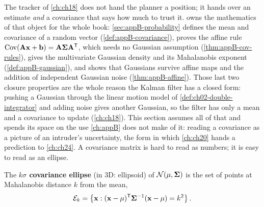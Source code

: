 The tracker of \cref{ch:ch18} does not hand the planner a position; it hands over an estimate \emph{and} a covariance that says how much to trust it.  owns the mathematics of that object for the whole book: \cref{sec:appB-probability} defines the mean and covariance of a random vector (\cref{def:appB-covariance}), proves the affine rule $\operatorname{Cov}(\mathbf{A}\mathbf{x}+\mathbf{b})=\mathbf{A}\mathbf{\Sigma}\mathbf{A}^{\mathsf{T}}$, which needs no Gaussian assumption (\cref{thm:appB-cov-rules}), gives the multivariate Gaussian density and its Mahalanobis exponent (\cref{def:appB-gaussian}), and shows that Gaussians survive affine maps and the addition of independent Gaussian noise (\cref{thm:appB-affine}). Those last two closure properties are the whole reason the Kalman filter has a closed form: pushing a Gaussian through the linear motion model of \cref{def:ch02-double-integrator} and adding noise gives another Gaussian, so the filter has only a mean and a covariance to update (\cref{ch:ch18}). This section assumes all of that and spends its space on the use \cref{ch:appB} does not make of it: reading a covariance as a picture of an intruder's uncertainty, the form in which \cref{ch:ch20} hands a prediction to \cref{ch:ch24}. A covariance matrix is hard to read as numbers; it is easy to read as an ellipse.

\begin{definition}
\label{def:ch02-covariance-ellipse}
The \textbf{$k\sigma$ covariance ellipse} (in 3D: ellipsoid) of $\mathcal{N}(\mathbf{\mu},\mathbf{\Sigma})$ is the set of points at Mahalanobis distance $k$ from the mean,
\begin{equation}
\mathcal{E}_k=\left\{ \mathbf{x} : (\mathbf{x}-\mathbf{\mu})^{\mathsf{T}}\mathbf{\Sigma}^{-1}(\mathbf{x}-\mathbf{\mu})=k^2 \right\}.
\label{eq:ch02-ellipse}
\end{equation}
\end{definition}

